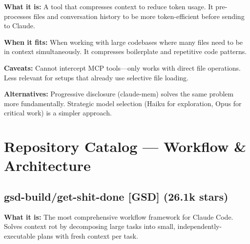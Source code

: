 \documentclass[11pt,a4paper]{article}
\begin{document}
\textbf{What it is:} A tool that compresses context to reduce token usage. It pre-processes files and conversation history to be more token-efficient before sending to Claude.

\textbf{When it fits:} When working with large codebases where many files need to be in context simultaneously. It compresses boilerplate and repetitive code patterns.

\textbf{Caveats:} Cannot intercept MCP tools---only works with direct file operations. Less relevant for setups that already use selective file loading.

\textbf{Alternatives:} Progressive disclosure (claude-mem) solves the same problem more fundamentally. Strategic model selection (Haiku for exploration, Opus for critical work) is a simpler approach.

\newpage

\section{Repository Catalog --- Workflow \& Architecture}

\subsection{gsd-build/get-shit-done [GSD] (26.1k stars)}

\textbf{What it is:} The most comprehensive workflow framework for Claude Code. Solves context rot by decomposing large tasks into small, independently-executable plans with fresh context per task.
\end{document}
